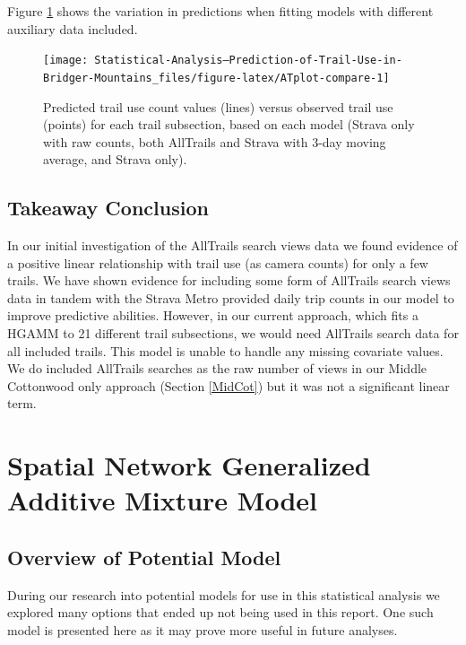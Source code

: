 \documentclass[
]{book}
\begin{document}
Figure \ref{fig:ATplot-compare} shows the variation in predictions when fitting models with different auxiliary data included.

\begin{figure}

{\centering \texttt{[image: Statistical-Analysis--Prediction-of-Trail-Use-in-Bridger-Mountains\_files/figure-latex/ATplot-compare-1]} 

}

\caption{Predicted trail use count values (lines) versus observed trail use (points) for each trail subsection, based on each model (Strava only with raw counts, both AllTrails and Strava with 3-day moving average, and Strava only).}\label{fig:ATplot-compare}
\end{figure}

\hypertarget{takeaway-conclusion}{%
\section{Takeaway Conclusion}\label{takeaway-conclusion}}

In our initial investigation of the AllTrails search views data we found evidence of a positive linear relationship with trail use (as camera counts) for only a few trails. We have shown evidence for including some form of AllTrails search views data in tandem with the Strava Metro provided daily trip counts in our model to improve predictive abilities. However, in our current approach, which fits a HGAMM to 21 different trail subsections, we would need AllTrails search data for all included trails. This model is unable to handle any missing covariate values. We do included AllTrails searches as the raw number of views in our Middle Cottonwood only approach (Section \ref{MidCot}) but it was not a significant linear term.

\hypertarget{Spatial}{%
\chapter{Spatial Network Generalized Additive Mixture Model}\label{Spatial}}

\hypertarget{overview-of-potential-model}{%
\section{Overview of Potential Model}\label{overview-of-potential-model}}

During our research into potential models for use in this statistical analysis we explored many options that ended up not being used in this report. One such model is presented here as it may prove more useful in future analyses.
\end{document}
